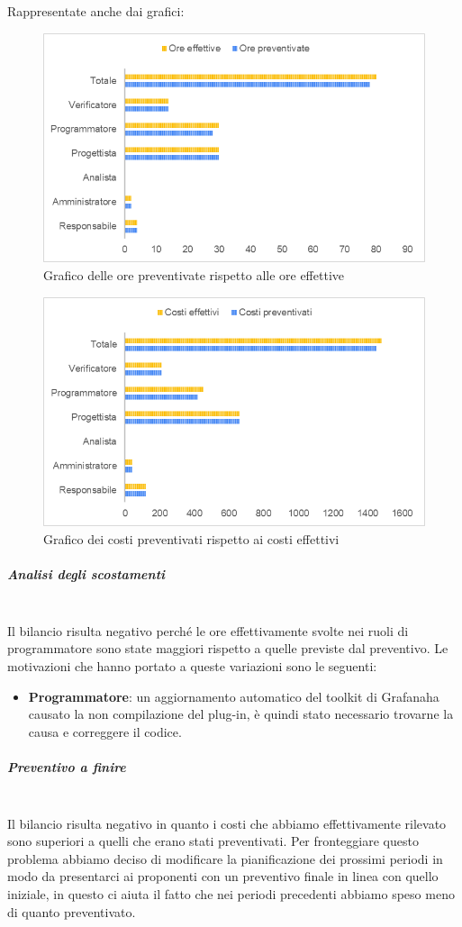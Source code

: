 Rappresentate anche dai grafici:
\begin{figure} [H]
	\includegraphics[width=\linewidth]{./img/Grafici/39.png}
	\caption{Grafico delle ore preventivate rispetto alle ore effettive}
\end{figure}

\begin{figure} [H]
	\includegraphics[width=\linewidth]{./img/Grafici/40.png}
	\caption{Grafico dei costi preventivati rispetto ai costi effettivi}
\end{figure}

\subparagraph*{Analisi degli scostamenti} \mbox{} \\
Il bilancio risulta negativo perché le ore effettivamente svolte nei ruoli di programmatore sono state maggiori rispetto a quelle previste dal preventivo.
Le motivazioni che hanno portato a queste variazioni sono le seguenti:
\begin{itemize}
	\item \textbf{Programmatore}: un aggiornamento automatico del toolkit di Grafana\glosp ha causato la non compilazione del plug-in, è quindi stato necessario trovarne la causa e correggere il codice.
\end{itemize}
\subparagraph*{Preventivo a finire} \mbox{} \\
Il bilancio risulta negativo in quanto i costi che abbiamo effettivamente rilevato sono superiori a quelli che erano stati preventivati. Per fronteggiare questo problema abbiamo deciso di modificare la pianificazione dei prossimi periodi in modo da presentarci ai proponenti con un preventivo finale in linea con quello iniziale, in questo ci aiuta il fatto che nei periodi precedenti abbiamo speso meno di quanto preventivato.


